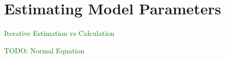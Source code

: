 



\section{Estimating Model Parameters}

\textcolor{green}{Iterative Estimation vs Calculation}

\textcolor{green}{TODO: Normal Equation}













